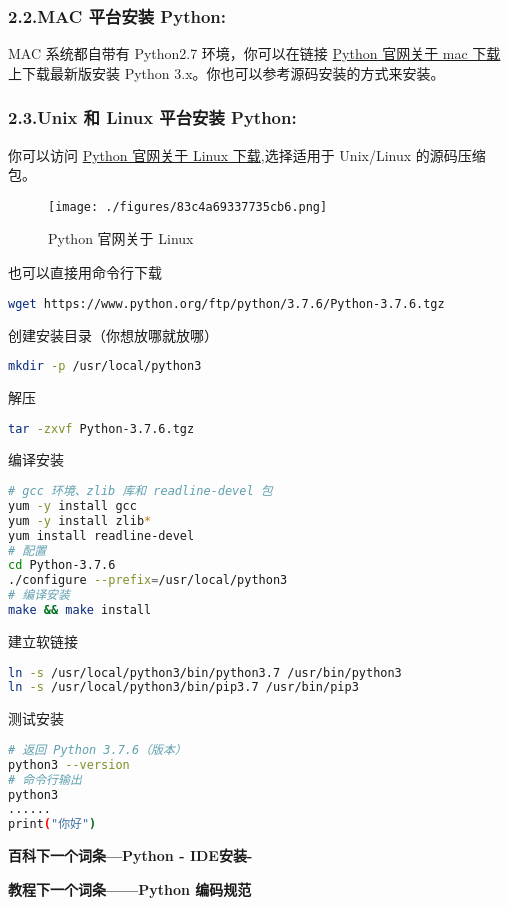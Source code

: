 \subsubsection{2.2.MAC 平台安装 Python:}
MAC 系统都自带有 Python2.7 环境，你可以在链接 \href{https://www.python.org/downloads/mac-osx/}{Python 官网关于 mac 下载} 上下载最新版安装 Python 3.x。你也可以参考源码安装的方式来安装。

\subsubsection{2.3.Unix 和 Linux 平台安装 Python:}
你可以访问 \href{https://www.python.org/downloads/source/}{Python 官网关于 Linux 下载},选择适用于 Unix/Linux 的源码压缩包。
\begin{figure}[ht]
\centering
\texttt{[image: ./figures/83c4a69337735cb6.png]}
\caption{Python 官网关于 Linux} \label{fig_Python_2}
\end{figure}

也可以直接用命令行下载
\begin{lstlisting}[language=bash]
wget https://www.python.org/ftp/python/3.7.6/Python-3.7.6.tgz
\end{lstlisting}

创建安装目录（你想放哪就放哪）
\begin{lstlisting}[language=bash]
mkdir -p /usr/local/python3
\end{lstlisting}

解压
\begin{lstlisting}[language=bash]
tar -zxvf Python-3.7.6.tgz
\end{lstlisting}

编译安装
\begin{lstlisting}[language=bash]
# gcc 环境、zlib 库和 readline-devel 包
yum -y install gcc
yum -y install zlib*
yum install readline-devel
# 配置
cd Python-3.7.6
./configure --prefix=/usr/local/python3
# 编译安装
make && make install
\end{lstlisting}

建立软链接
\begin{lstlisting}[language=bash]
ln -s /usr/local/python3/bin/python3.7 /usr/bin/python3
ln -s /usr/local/python3/bin/pip3.7 /usr/bin/pip3
\end{lstlisting}

测试安装
\begin{lstlisting}[language=bash]
# 返回 Python 3.7.6（版本）
python3 --version
# 命令行输出
python3
......
print("你好")
\end{lstlisting}

\textbf{百科下一个词条—Python - IDE安装-}

\textbf{教程下一个词条——Python 编码规范}
